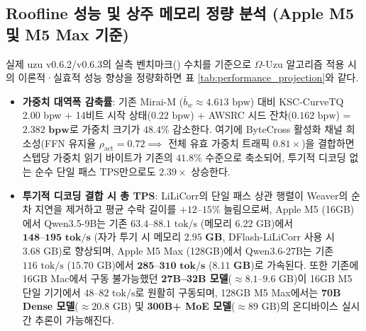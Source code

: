 \documentclass[10pt,a4paper]{article}
\begin{document}
\subsection{Roofline 성능 및 상주 메모리 정량 분석 (Apple M5 및 M5 Max 기준)}
실제 \textsf{uzu} v0.6.2/v0.6.3의 실측 벤치마크(\cite{mirai2026specdec,zenn2026uzu}) 수치를 기준으로 $\Omega$-Uzu 알고리즘 적용 시의 이론적·실효적 성능 향상을 정량화하면 표 \ref{tab:performance_projection}와 같다.
\begin{itemize}\setlength{\itemsep}{2pt}\setlength{\parskip}{0pt}
  \item \textbf{가중치 대역폭 감축률}: 기존 \textsf{Mirai-M} ($\bar{b}_w \approx 4.613\text{ bpw}$) 대비 KSC-CurveTQ 2.00 bpw + 14비트 시작 상태($0.22\text{ bpw}$) + AWSRC 시드 잔차($0.162\text{ bpw}$) = $\mathbf{2.382\text{ bpw}}$로 가중치 크기가 $48.4\%$ 감소한다. 여기에 \textsf{ByteCross} 활성화 채널 희소성(FFN 유지율 $\rho_{\text{act}}=0.72 \implies$ 전체 유효 가중치 트래픽 $0.81\times$)을 결합하면 스텝당 가중치 읽기 바이트가 기존의 $\mathbf{41.8\%}$ 수준으로 축소되어, 투기적 디코딩 없는 순수 단일 패스 TPS만으로도 $\mathbf{2.39\times}$ 상승한다.
  \item \textbf{투기적 디코딩 결합 시 총 TPS}: \textsf{LiLiCorr}의 단일 패스 상관 행렬이 \textsf{Weaver}의 순차 지연을 제거하고 평균 수락 길이를 $+12\text{--}15\%$ 늘림으로써, Apple M5 (16GB)에서 \textsf{Qwen3.5-9B}는 기존 $63.4\text{--}88.1\text{ tok/s}$ (메모리 $6.22\text{ GB}$)에서 $\mathbf{148\text{--}195\text{ tok/s}}$ (자가 투기 시 메모리 $\mathbf{2.95\text{ GB}}$, \textsf{DFlash-LiLiCorr} 사용 시 $3.68\text{ GB}$)로 향상되며, Apple M5 Max (128GB)에서 \textsf{Qwen3.6-27B}는 기존 $116\text{ tok/s}$ ($15.70\text{ GB}$)에서 $\mathbf{285\text{--}310\text{ tok/s}}$ ($\mathbf{8.11\text{ GB}}$)로 가속된다. 또한 기존에 16GB Mac에서 구동 불가능했던 \textbf{27B--32B 모델}($\approx 8.1\text{--}9.6\text{ GB}$)이 16GB M5 단일 기기에서 $48\text{--}82\text{ tok/s}$로 원활히 구동되며, 128GB M5 Max에서는 \textbf{70B Dense 모델}($\approx 20.8\text{ GB}$) 및 \textbf{300B+ MoE 모델}($\approx 89\text{ GB}$)의 온디바이스 실시간 추론이 가능해진다.
\end{itemize}
\end{document}
